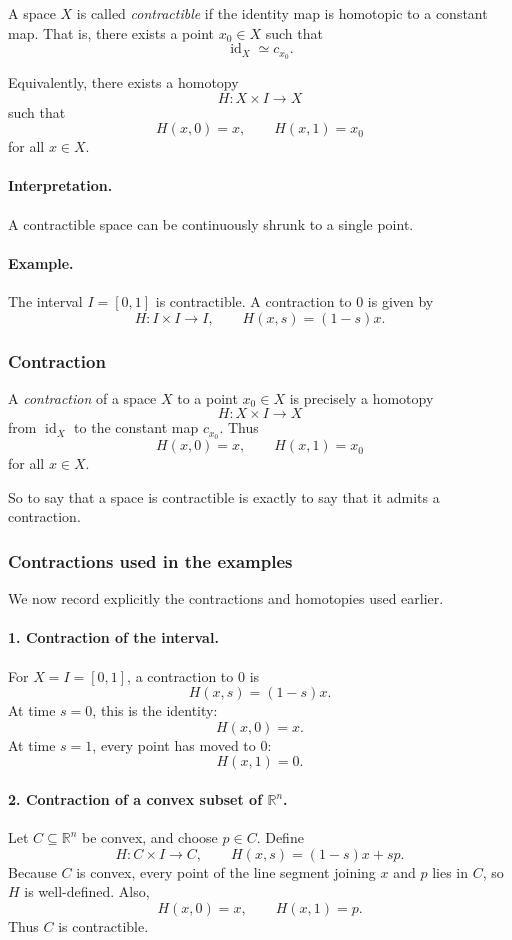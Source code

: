 \documentclass[12pt,a4paper]{article}
\theoremstyle{notespace}
\begin{document}
A space \(X\) is called \emph{contractible} if the identity map is homotopic to a constant map. That is, there exists a point \(x_0\in X\) such that
\[
\operatorname{id}_X \simeq c_{x_0}.
\]

Equivalently, there exists a homotopy
\[
H:X\times I\to X
\]
such that
\[
H(x,0)=x,
\qquad
H(x,1)=x_0
\]
for all \(x\in X\).

\paragraph{Interpretation.}
A contractible space can be continuously shrunk to a single point.

\paragraph{Example.}
The interval \(I=[0,1]\) is contractible.  
A contraction to \(0\) is given by
\[
H:I\times I\to I,
\qquad
H(x,s)=(1-s)x.
\]

\subsubsection{Contraction}

A \emph{contraction} of a space \(X\) to a point \(x_0\in X\) is precisely a homotopy
\[
H:X\times I\to X
\]
from \(\operatorname{id}_X\) to the constant map \(c_{x_0}\). Thus
\[
H(x,0)=x,
\qquad
H(x,1)=x_0
\]
for all \(x\in X\).

So to say that a space is contractible is exactly to say that it admits a contraction.

\subsubsection{Contractions used in the examples}

We now record explicitly the contractions and homotopies used earlier.

\paragraph{1. Contraction of the interval.}
For \(X=I=[0,1]\), a contraction to \(0\) is
\[
H(x,s)=(1-s)x.
\]
At time \(s=0\), this is the identity:
\[
H(x,0)=x.
\]
At time \(s=1\), every point has moved to \(0\):
\[
H(x,1)=0.
\]

\paragraph{2. Contraction of a convex subset of \(\mathbb{R}^n\).}
Let \(C\subseteq \mathbb{R}^n\) be convex, and choose \(p\in C\). Define
\[
H:C\times I\to C,
\qquad
H(x,s)=(1-s)x+sp.
\]
Because \(C\) is convex, every point of the line segment joining \(x\) and \(p\) lies in \(C\), so \(H\) is well-defined. Also,
\[
H(x,0)=x,
\qquad
H(x,1)=p.
\]
Thus \(C\) is contractible.
\end{document}
